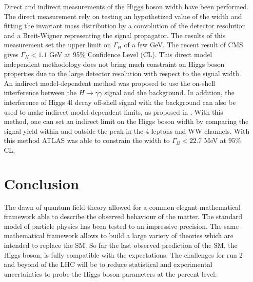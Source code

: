 Direct and indirect measurements of the Higgs boson width have been performed.
The direct measurement rely on testing an hypothetized value of the width and fitting the invariant mass distribution by a convolution of the detector resolution and a Breit-Wigner representing the signal propagator.
The results of this measurement \cite{CERN-THESIS-2015-193,CERN-PH-EP-2014-122} set the upper limit on $\Gamma_H$ of a few GeV.
The recent result of CMS \cite{CMS-PAS-HIG-16-041,CMS-HIG-16-041} gives $\Gamma_H < 1.1$ GeV at 95\% Confidence Level (CL).
This direct model independent methodology does not bring much constraint on Higgs boson properties due to the large detector resolution with respect to the signal width.
An indirect model-dependent method was proposed \cite{Dixon:2013haa} to use the on-shell interference between the \(H\rightarrow\gamma\gamma\) signal and the background.
In addition, the interference of Higgs 4l decay off-shell signal with the background can also be used to make indirect model dependent limits, as proposed in \cite{Caola:2013yja}.
With this method, one can set an indirect limit on the Higgs boson width by comparing the signal yield within and outside the peak in the 4 leptons and WW channels.
With this method ATLAS \cite{ATLAS-CONF-2014-042,CERN-PH-EP-2015-026} was able to constrain the width to $\Gamma_H <22.7$ MeV at 95\% CL.




\section{Conclusion}
\label{sec:org69deba1}
The dawn of quantum field theory allowed for a common elegant mathematical framework able to describe the observed behaviour of the matter.
The standard model of particle physics has been tested to an impressive precision.
The same mathematical framework allows to build a large variety of theories which are intended to replace the SM.
So far the last observed prediction of the SM, the Higgs boson, is fully compatible with the expectations.
The challenges for run 2 and beyond of the LHC will be to reduce statistical and experimental uncertainties to probe the Higgs boson parameters at the percent level.
